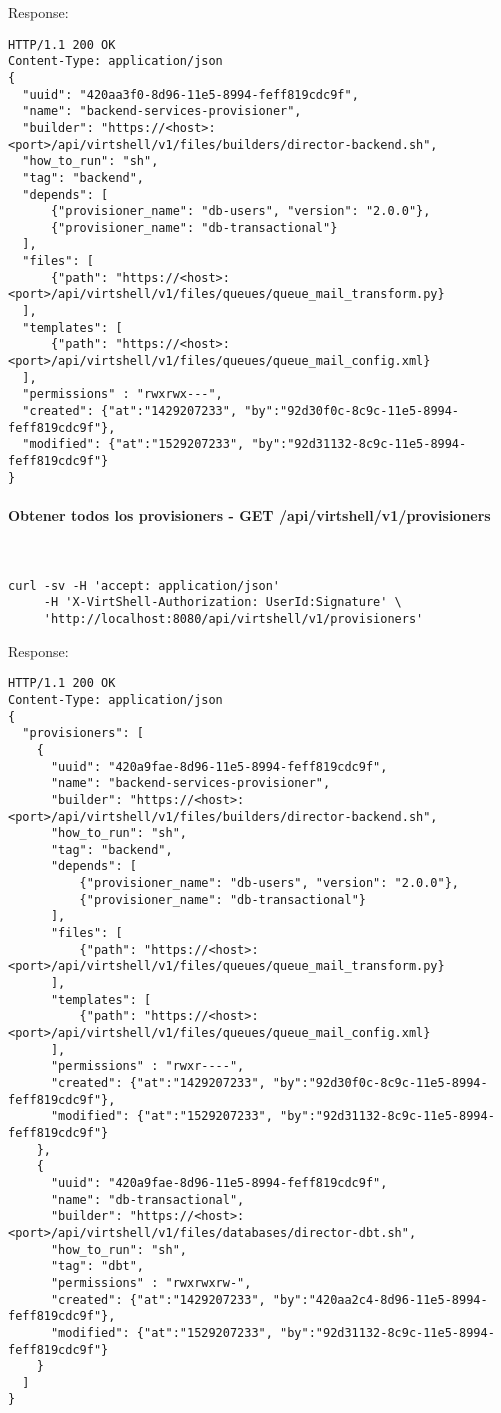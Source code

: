 Response:

\begin{lstlisting}[style=json]
HTTP/1.1 200 OK
Content-Type: application/json
{
  "uuid": "420aa3f0-8d96-11e5-8994-feff819cdc9f",
  "name": "backend-services-provisioner",
  "builder": "https://<host>:<port>/api/virtshell/v1/files/builders/director-backend.sh",
  "how_to_run": "sh",
  "tag": "backend",
  "depends": [
      {"provisioner_name": "db-users", "version": "2.0.0"},
      {"provisioner_name": "db-transactional"}
  ],
  "files": [
      {"path": "https://<host>:<port>/api/virtshell/v1/files/queues/queue_mail_transform.py}
  ],
  "templates": [
      {"path": "https://<host>:<port>/api/virtshell/v1/files/queues/queue_mail_config.xml}
  ],
  "permissions" : "rwxrwx---",        
  "created": {"at":"1429207233", "by":"92d30f0c-8c9c-11e5-8994-feff819cdc9f"},
  "modified": {"at":"1529207233", "by":"92d31132-8c9c-11e5-8994-feff819cdc9f"}
}
\end{lstlisting}

\paragraph{Obtener todos los provisioners - GET /api/virtshell/v1/provisioners} ~\\

\begin{lstlisting}[style=json]
curl -sv -H 'accept: application/json' 
     -H 'X-VirtShell-Authorization: UserId:Signature' \ 
     'http://localhost:8080/api/virtshell/v1/provisioners'
\end{lstlisting}

Response:

\begin{lstlisting}[style=json]
HTTP/1.1 200 OK
Content-Type: application/json
{
  "provisioners": [
    { 
      "uuid": "420a9fae-8d96-11e5-8994-feff819cdc9f",
      "name": "backend-services-provisioner",
      "builder": "https://<host>:<port>/api/virtshell/v1/files/builders/director-backend.sh",
      "how_to_run": "sh",
      "tag": "backend",
      "depends": [
          {"provisioner_name": "db-users", "version": "2.0.0"},
          {"provisioner_name": "db-transactional"}
      ],
      "files": [
          {"path": "https://<host>:<port>/api/virtshell/v1/files/queues/queue_mail_transform.py}
      ],
      "templates": [
          {"path": "https://<host>:<port>/api/virtshell/v1/files/queues/queue_mail_config.xml}
      ],
      "permissions" : "rwxr----",      
      "created": {"at":"1429207233", "by":"92d30f0c-8c9c-11e5-8994-feff819cdc9f"},
      "modified": {"at":"1529207233", "by":"92d31132-8c9c-11e5-8994-feff819cdc9f"}
    },
    { 
      "uuid": "420a9fae-8d96-11e5-8994-feff819cdc9f",
      "name": "db-transactional",
      "builder": "https://<host>:<port>/api/virtshell/v1/files/databases/director-dbt.sh",
      "how_to_run": "sh",
      "tag": "dbt",
      "permissions" : "rwxrwxrw-",        
      "created": {"at":"1429207233", "by":"420aa2c4-8d96-11e5-8994-feff819cdc9f"},
      "modified": {"at":"1529207233", "by":"92d31132-8c9c-11e5-8994-feff819cdc9f"}
    }    
  ]
} 
\end{lstlisting}

